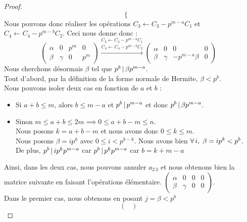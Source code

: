 \documentclass[12pt]{article}
\begin{document}
\begin{proof}
$$\begin{cases*}
		\end{cases*}$$
	Nous pouvons donc réaliser les opérations $C_3 \leftarrow C_3 -p^{m-a}C_1$ et
	$C_4 \leftarrow C_4 -p^{m-b}C_2$. Ceci nous donne donc :
	\begin{equation*}
		\begin{pmatrix}
			\alpha & 0      & p^m & 0   \\
			\beta  & \gamma & 0   & p^m
		\end{pmatrix}
		\overset{C_3 \leftarrow C_3 -p^{m-a}C_1 }%
		{\overset{ C_4 \leftarrow C_4 -p^{m-b}C_2}{\longrightarrow}}
		\begin{pmatrix}
			\alpha & 0      & 0             & 0 \\
			\beta  & \gamma & -p^{m-a}\beta & 0
		\end{pmatrix}
	\end{equation*}
	Nous cherchons désormais $\beta$ tel que $p^b \, | \, \beta p^{m-a}$.\\
	Tout d'abord, par la définition de la forme normale de Hermite, $\beta< p^b$.\\
	Nous pouvons isoler deux cas en fonction de $a$ et $b$ :\\
	\begin{itemize}
		\item Si $a + b \le m$, alors $b \le m - a$ et $p^b \, | \, p^{m-a}$ et
		      donc $p^b \, | \, \beta p^{m-a}$.\\
		\item Sinon $m \le a + b \le 2m \implies 0 \le a + b -m \le n$.\\
		      Nous posons $k = a + b -m$ et nous avons donc $0 \le k \le m$.\\
		      Nous posons $\beta = ip^k$ avec $0 \le i < p^{b - k}$. Nous avons bien
		      $\forall \, i , \; \beta = ip^k < p^b$.\\
		      De plus, $p^b \, | \, ip^kp^{m-a}$ car  $p^b \, | \, p^kp^{m-a}$
		      car  $b = k + m - a$
	\end{itemize}
	Ainsi, dans les deux cas, nous pouvons annuler $a_{2\,3}$ et nous obtenons bien la matrice
	suivante en faisant l'opérations élémentaire.
	$\begin{pmatrix}
			\alpha & 0      & 0 & 0 \\
			\beta  & \gamma & 0 & 0
		\end{pmatrix}$.\\
	Dans le premier cas, nous obtenons en posant $j = \beta < p^b$
	\begin{equation*}
		\begin{pmatrix}

\end{pmatrix}
\end{equation*}
\end{proof}
\end{document}
